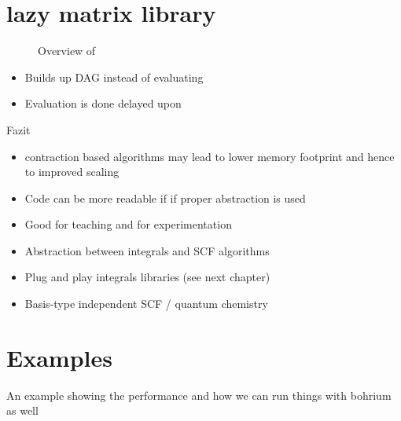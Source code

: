 \section{\lazyten lazy matrix library}

\begin{figure}
	\centering
	\caption{Overview of \lazyten}
	\label{fig:structureLazyten}
\end{figure}




\begin{itemize}
	\item Builds up DAG instead of evaluating
	\item Evaluation is done delayed upon \contraction
	
\end{itemize}

Fazit
\begin{itemize}
	\item contraction based algorithms may lead to lower memory footprint and
		hence to improved scaling
	\item Code can be more readable if if proper abstraction is used
	\item Good for teaching and for experimentation
	\item Abstraction between integrals and SCF algorithms
	\item Plug and play integrals libraries (see next chapter)
	\item Basis-type independent SCF / quantum chemistry
\end{itemize}

\section{Examples}
An example showing the performance and how we can run things with bohrium as well
